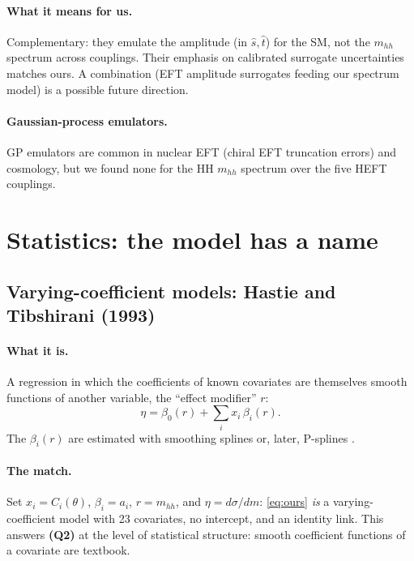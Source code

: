 \paragraph{What it means for us.} Complementary: they emulate the amplitude (in
$\hat s,\hat t$) for the SM, not the $m_{hh}$ spectrum across couplings. Their emphasis on
calibrated surrogate uncertainties matches ours. A combination (EFT amplitude surrogates
feeding our spectrum model) is a possible future direction.

\paragraph{Gaussian-process emulators.} GP emulators are common in nuclear EFT (chiral EFT
truncation errors) and cosmology, but we found none for the HH $m_{hh}$ spectrum over the
five HEFT couplings.

\section{Statistics: the model has a name}
\label{sec:stats}

\subsection{Varying-coefficient models: Hastie and Tibshirani (1993) \cite{HastieTibshirani1993}}

\paragraph{What it is.} A regression in which the coefficients of known covariates are
themselves smooth functions of another variable, the ``effect modifier'' $r$:
\begin{equation}
\eta = \beta_0(r) + \sum_i x_i\,\beta_i(r).
\end{equation}
The $\beta_i(r)$ are estimated with smoothing splines or, later, P-splines
\cite{EilersMarx1996,EilersMarx2021}.

\paragraph{The match.} Set $x_i = C_i(\theta)$, $\beta_i = a_i$, $r = m_{hh}$, and
$\eta = d\sigma/dm$: \cref{eq:ours} \emph{is} a varying-coefficient model with 23 covariates,
no intercept, and an identity link. This answers \textbf{(Q2)} at the level of statistical
structure: smooth coefficient functions of a covariate are textbook.

